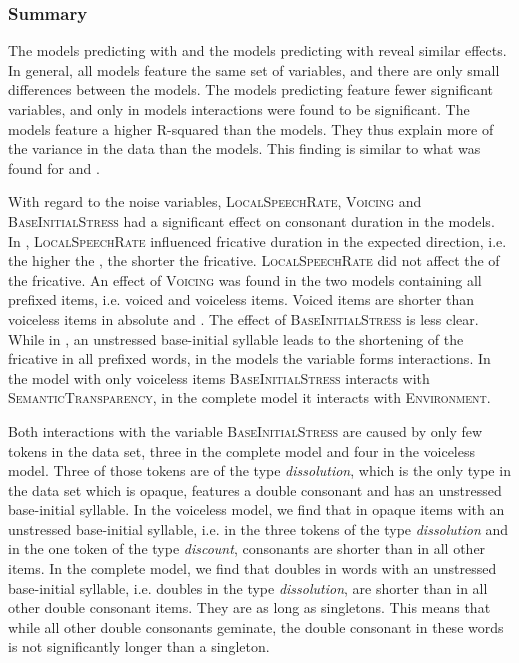 \subsubsection{Summary}
The models predicting  with  and the models predicting  with  reveal similar effects. In general, all models feature the same set of variables, and there are only small differences between the models. The models predicting  feature fewer significant variables, and only in  models interactions were found to be significant. 
The  models feature a higher R-squared than the  models. They thus explain more of the variance in the data than the  models. This finding is similar to what was found for  and . 

With regard to the noise variables, \textsc{LocalSpeechRate}, \textsc{Voicing}  and \textsc{BaseInitialStress} had a significant effect on consonant duration in the models. 
In , \textsc{LocalSpeechRate} influenced fricative duration in the expected direction, i.e. the higher the , the shorter the fricative. \textsc{LocalSpeech\-Rate} did not affect the  of the fricative. 
An effect of \textsc{Voicing} was found in the two models containing all prefixed items, i.e. voiced and voiceless items. Voiced items are shorter than voiceless items in absolute and .
The effect of \textsc{BaseInitialStress} is less clear. While in , an unstressed base-initial syllable leads to the shortening of the fricative in all prefixed words, in the  models the variable forms interactions. In the model with only voiceless items \textsc{BaseInitialStress} interacts with \textsc{SemanticTransparency},  in the complete model it interacts with \textsc{Environment}.



Both interactions with the variable \textsc{BaseInitialStress} are caused by only few tokens in the data set, three in the complete model and four in the voiceless model. Three of those tokens are of the type \textit{dissolution}, which is the only type in the data set which is opaque, features a double consonant and has an unstressed base-initial syllable. 
In the voiceless model, we find that in opaque items with an unstressed base-initial syllable, i.e. in the three tokens of the type \textit{dissolution} and in the one token of the type \textit{discount}, consonants are shorter than in all other items. 
In the complete model, we find that doubles in words with an unstressed base-initial syllable, i.e. doubles in the type \textit{dissolution}, are shorter than in all other double consonant items. They are as long as singletons. This means that while all other double consonants geminate, the double consonant in these words is not significantly longer than a singleton.

